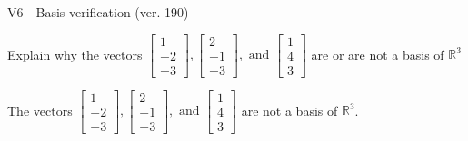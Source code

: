 \begin{exercise}
  \begin{exerciseTitle}V6 - Basis verification (ver. 190)\end{exerciseTitle}
  \begin{exerciseStatement}
    Explain why the vectors \(\left[\begin{array}{r}
1 \\
-2 \\
-3
\end{array}\right] , \left[\begin{array}{r}
2 \\
-1 \\
-3
\end{array}\right] , \text{ and } \left[\begin{array}{r}
1 \\
4 \\
3
\end{array}\right]\) are or are not a basis of \(\mathbb{R}^3\)	


  \end{exerciseStatement}
  \begin{exerciseAnswer}
   The vectors \(\left[\begin{array}{r}
1 \\
-2 \\
-3
\end{array}\right] , \left[\begin{array}{r}
2 \\
-1 \\
-3
\end{array}\right] , \text{ and } \left[\begin{array}{r}
1 \\
4 \\
3
\end{array}\right]\) 
  	 are not  a basis of \(\mathbb{R}^3\).
  


  \end{exerciseAnswer}
\end{exercise}
